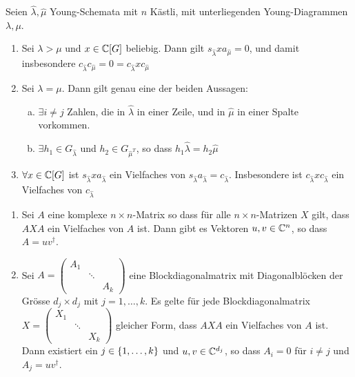 \begin{lemma}
    Seien $\hat{\lambda} , \hat{\mu}$ Young-Schemata mit $n$ Kästli, mit
    unterliegenden Young-Diagrammen $\lambda,\mu$.
    \begin{enumerate}[(1)]
        \item Sei $\lambda > \mu$ und $x \in \mathbb{C}[G]$ beliebig. Dann gilt
            $s_{\hat{\lambda}} x a_{\hat{\mu}} = 0$, und damit insbesondere
            $c_{\hat{\lambda}} c_{\hat{\mu}} = 0 = c_{\hat{\lambda}} x c_{\hat{\mu}}$
        \item Sei $\lambda = \mu$. Dann gilt genau eine der beiden Aussagen:
            \begin{enumerate}[(a)]
                \item $\exists i \neq j$ Zahlen, die in $\hat{\lambda}$ in einer
                    Zeile, und in $\hat{\mu}$ in einer Spalte vorkommen.
                \item $\exists h_1 \in G_{\hat{\lambda}}$ und $h_2 \in G_{\hat{\mu}^T}$,
                    so dass $h_1 \hat{\lambda} = h_2 \hat{\mu}$
            \end{enumerate}
        \item $\forall x \in \mathbb{C}[G]$ ist $s_{\hat{\lambda}} x a_{\hat{\lambda}}$
            ein Vielfaches von $s_{\hat{\lambda}} a_{\hat{\lambda}} = c_{\hat{\lambda}}$.
            Insbesondere ist $c_{\hat{\lambda}} x c_{\hat{\lambda}}$ ein Vielfaches
            von $c_{\hat{\lambda}}$
    \end{enumerate}
\end{lemma}

\begin{lemma}
    \begin{enumerate}[(1)]
        \item Sei $A$ eine komplexe $n \times n$-Matrix so dass für alle $n \times n$-Matrizen
            $X$ gilt, dass $A X A$ ein Vielfaches von $A$ ist. Dann gibt es Vektoren
            $u,v \in \mathbb{C}^n$, so dass $A = u v^\dagger$.
        \item Sei $A = \begin{pmatrix}
            A_1 & & \\ & \ddots & \\ & & A_k
        \end{pmatrix}$ eine Blockdiagonalmatrix mit Diagonalblöcken der Grösse
        $d_j \times d_j$ mit $j = 1,\dots,k$. Es gelte für jede Blockdiagonalmatrix
        $X = \begin{pmatrix}
            X_1 & & \\ & \ddots & \\ & & X_k
        \end{pmatrix}$ gleicher Form, dass $A X A$ ein Vielfaches von $A$ ist.
        Dann existiert ein $j \in \left\{ 1,\dots,k \right\}$ und $u,v \in \mathbb{C}^{d_j}$,
        so dass $A_i = 0$ für $i \neq j$ und $A_j = u v^\dagger$.
    \end{enumerate}
\end{lemma}


